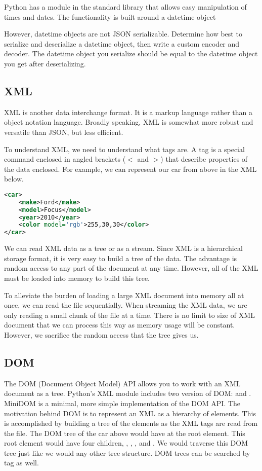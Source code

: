 \begin{problem}
Python has a module in the standard library that allows easy manipulation of times and dates.  The functionality is built around a datetime object

However, datetime objects are not JSON serializable.
Determine how best to serialize and deserialize a datetime object, then write a custom encoder and decoder.
The datetime object you serialize should be equal to the datetime object you get after deserializing.
\label{prob:datetime_json}
\end{problem}

\subsection*{XML}
XML is another data interchange format.
It is a markup language rather than a object notation language.
Broadly speaking, XML is somewhat more robust and versatile than JSON, but less efficient.

To understand XML, we need to understand what tags are.
A tag is a special command enclosed in angled brackets ($<$ and $>$) that describe properties of the data enclosed.
For example, we can represent our car from above in the XML below.
\begin{lstlisting}[language=XML]
<car>
    <make>Ford</make>
    <model>Focus</model>
    <year>2010</year>
    <color model='rgb'>255,30,30</color>
</car>
\end{lstlisting}
We can read XML data as a tree or as a stream.
Since XML is a hierarchical storage format, it is very easy to build a tree of the data.
The advantage is random access to any part of the document at any time.
However, all of the XML must be loaded into memory to build this tree.

To alleviate the burden of loading a large XML document into memory all at once, we can read the file sequentially.
When streaming the XML data, we are only reading a small chunk of the file at a time.
There is no limit to size of XML document that we can process this way as memory usage will be constant.
However, we sacrifice the random access that the tree gives us.

\subsection*{DOM}
The DOM (Document Object Model) API allows you to work with an XML document as a tree.
Python's XML module includes two version of DOM:  and .
MiniDOM is a minimal, more simple implementation of the DOM API.
The motivation behind DOM is to represent an XML as a hierarchy of elements.
This is accomplished by building a tree of the elements as the XML tags are read from the file.
The DOM tree of the car above would have  at the root element.
This root element would have four children, , , , and .
We would traverse this DOM tree just like we would any other tree structure.
DOM trees can be searched by tag as well.

